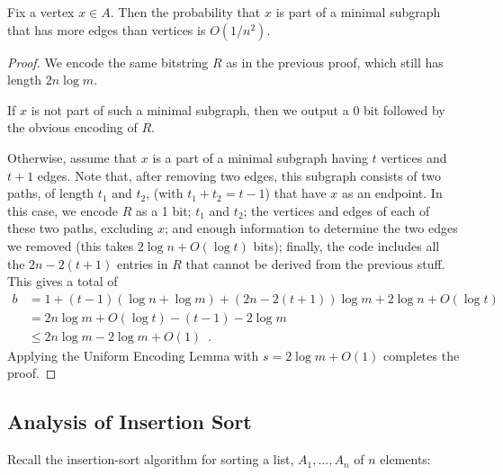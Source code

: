 \documentclass[lotsofwhite]{patmorin}
\begin{document}
\begin{thm}
  Fix a vertex $x\in A$.  Then the probability that $x$ is part of a
  minimal subgraph that has more edges than vertices is $O(1/n^2)$.
\end{thm}

\begin{proof}
  We encode the same bitstring $R$ as in the previous proof, which still
  has length $2n\log m$.

  If $x$ is not part of such a minimal subgraph, then we output a 0 bit
  followed by the obvious encoding of $R$.

  Otherwise, assume that $x$ is a part of a minimal subgraph having
  $t$ vertices and $t+1$ edges. Note that, after removing two edges,
  this subgraph consists of two paths, of length $t_1$ and $t_2$,
  (with $t_1+t_2=t-1$) that have $x$ as an endpoint.  In this case,
  we encode $R$ as a 1 bit; $t_1$ and $t_2$; the vertices and edges
  of each of these two paths, excluding $x$; and enough information to
  determine the two edges we removed (this takes $2\log n + O(\log t)$
  bits); finally, the code includes all the $2n-2(t+1)$ entries in $R$
  that cannot be derived from the previous stuff. This gives a total of
  \begin{align*}
     b &= 1 + (t-1)(\log n+\log m) + (2n-2(t+1))\log m + 2\log n + O(\log t) \\
        &= 2n\log m + O(\log t) - (t-1) - 2\log m \\
       & \le 2n\log m - 2\log m + O(1) \enspace .
  \end{align*}
  Applying the Uniform Encoding Lemma with $s=2\log m+O(1)$ completes
  the proof.
\end{proof}


\subsection{Analysis of Insertion Sort}

Recall the insertion-sort algorithm for sorting a list, $A_1,\ldots,A_n$
of $n$ elements:

\begin{algorithmic}[1]
     \ENDWHILE
  \ENDFOR
\end{algorithmic}
\end{document}

